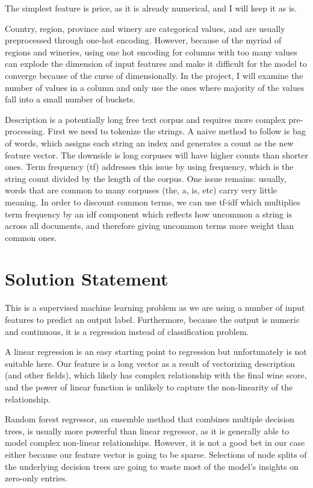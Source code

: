 \documentclass{article}
\begin{document}
The simplest feature is price, as it is already numerical, and I will keep it as is.

Country, region, province and winery are categorical values, and are usually preprocessed through one-hot encoding. However, because of the myriad of regions and wineries, using one hot encoding for columns with too many values can explode the dimension of input features and make it difficult for the model to converge because of the curse of dimensionally. In the project, I will examine the number of values in a column and only use the ones where majority of the values fall into a small number of buckets.

Description is a potentially long free text corpus and requires more complex pre-processing. First we need to tokenize the strings. A naive method to follow is bag of words, which assigns each string an index and generates a count as the new feature vector. The downside is long corpuses will have higher counts than shorter ones. Term frequency (tf) addresses this issue by using frequency, which is the string count divided by the length of the corpus. One issue remains: usually, words that are common to many corpuses (the, a, is, etc) carry very little meaning. In order to discount common terms, we can use tf-idf which multiplies term frequency by an idf component which reflects how uncommon a string is across all documents, and therefore giving uncommon terms more weight than common ones.

\section{Solution Statement}
This is a supervised machine learning problem as we are using a number of input features to predict an output label. Furthermore, because the output is numeric and continuous, it is a regression instead of classification problem.

A linear regression is an easy starting point to regression but unfortunately is not suitable here. Our feature is a long vector as a result of vectorizing description (and other fields), which likely has complex relationship with the final wine score, and the power of linear function is unlikely to capture the non-linearity of the relationship.

Random forest regressor, an ensemble method that combines multiple decision trees, is usually more powerful than linear regressor, as it is generally able to model complex non-linear relationships. However, it is not a good bet in our case either because our feature vector is going to be sparse. Selections of node splits of the underlying decision trees are going to waste most of the model's insights on zero-only entries.
\end{document}

